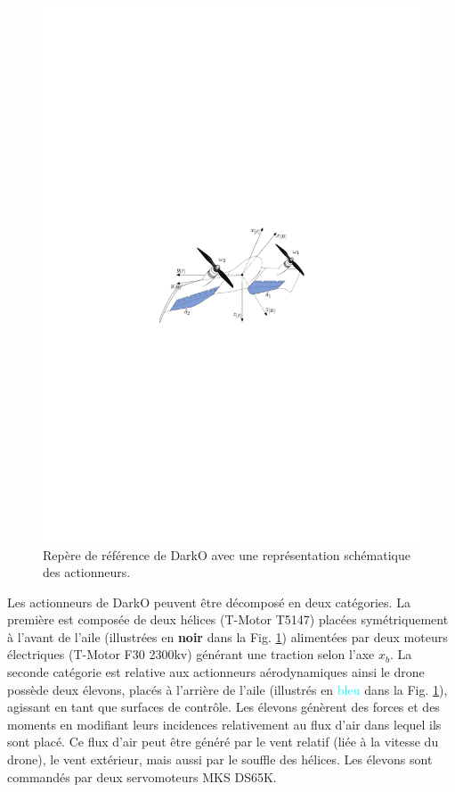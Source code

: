 
\begin{figure}[ht]
    \centering
    \includegraphics[width=1\columnwidth]{figures/darko.pdf}
    \caption{Repère de référence de DarkO avec une représentation schématique des actionneurs.}
    \label{fig:darko2}
\end{figure}

Les actionneurs de DarkO peuvent être décomposé en deux catégories. La première est composée de deux hélices (T-Motor T5147) placées symétriquement à l'avant de l'aile (illustrées en \textbf{noir} dans la Fig. \ref{fig:darko2}) alimentées par deux moteurs électriques (T-Motor F30 2300kv) générant une traction selon l'axe $x_{b}$. La seconde catégorie est relative aux actionneurs aérodynamiques ainsi le drone possède deux élevons, placés à l'arrière de l'aile (illustrés en \textcolor{cyan}{bleu} dans la Fig. \ref{fig:darko2}), agissant en tant que surfaces de contrôle. Les élevons génèrent des forces et des moments en modifiant leurs incidences relativement au flux d'air dans lequel ils sont placé. Ce flux d'air peut être généré par le vent relatif (liée à la vitesse du drone), le vent extérieur, mais aussi par le souffle des hélices. Les élevons sont commandés par deux servomoteurs MKS DS65K.

